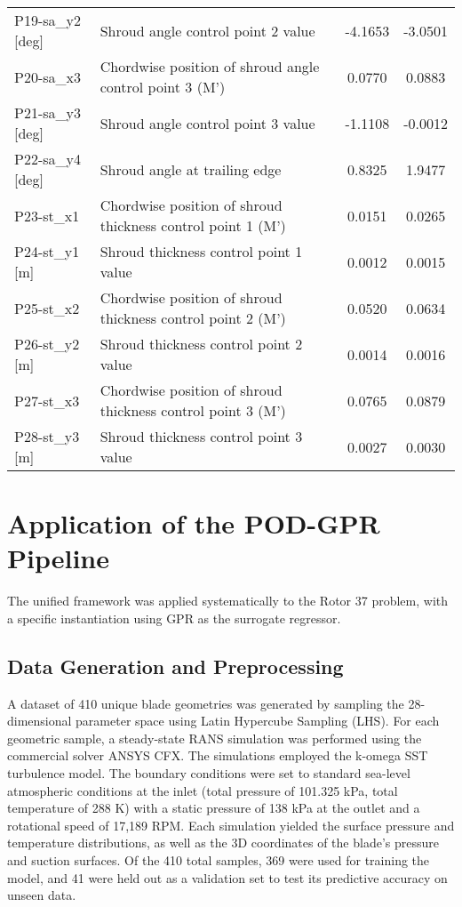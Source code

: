 \documentclass[dsc, EN]{ufabcFHZh}
\begin{document}
\begin{table}[htbp]
\begin{tabular}{|l|l|c|c|}
    P19-sa\_y2 [deg] & Shroud angle control point 2 value & -4.1653 & -3.0501 \\
    P20-sa\_x3 & Chordwise position of shroud angle control point 3 (M') & 0.0770 & 0.0883 \\
    P21-sa\_y3 [deg] & Shroud angle control point 3 value & -1.1108 & -0.0012 \\
    P22-sa\_y4 [deg] & Shroud angle at trailing edge & 0.8325 & 1.9477 \\
    P23-st\_x1 & Chordwise position of shroud thickness control point 1 (M') & 0.0151 & 0.0265 \\
    P24-st\_y1 [m] & Shroud thickness control point 1 value & 0.0012 & 0.0015 \\
    P25-st\_x2 & Chordwise position of shroud thickness control point 2 (M') & 0.0520 & 0.0634 \\
    P26-st\_y2 [m] & Shroud thickness control point 2 value & 0.0014 & 0.0016 \\
    P27-st\_x3 & Chordwise position of shroud thickness control point 3 (M') & 0.0765 & 0.0879 \\
    P28-st\_y3 [m] & Shroud thickness control point 3 value & 0.0027 & 0.0030 \\
    \hline
  \end{tabular}
\end{table}

\section{Application of the POD-GPR Pipeline}

The unified framework was applied systematically to the Rotor 37 problem, with a specific instantiation using GPR as the surrogate regressor.


\subsection{ Data Generation and Preprocessing}

A dataset of 410 unique blade geometries was generated by sampling the 28-dimensional parameter space using Latin Hypercube Sampling (LHS). For each geometric sample, a steady-state RANS simulation was performed using the commercial solver ANSYS CFX. The simulations employed the k-omega SST turbulence model. The boundary conditions were set to standard sea-level atmospheric conditions at the inlet (total pressure of 101.325 kPa, total temperature of 288 K) with a static pressure of 138 kPa at the outlet and a rotational speed of 17,189 RPM. Each simulation yielded the surface pressure and temperature distributions, as well as the 3D coordinates of the blade's pressure and suction surfaces. Of the 410 total samples, 369 were used for training the model, and 41 were held out as a validation set to test its predictive accuracy on unseen data. 
\end{document}
